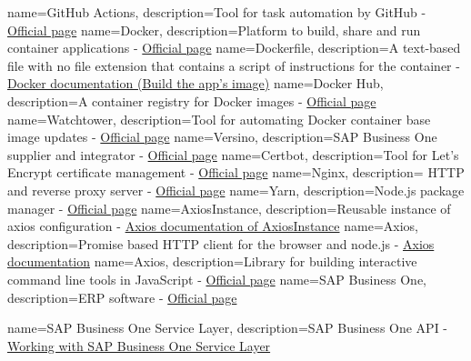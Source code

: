 {
        name=GitHub Actions,
        description={Tool for task automation by GitHub - \href{https://github.com/features/actions}{Official page}}
}
{
        name=Docker,
        description={Platform to build, share and run container applications - \href{https://www.docker.com}{Official page}}
}
{
        name=Dockerfile,
        description={A text-based file with no file extension that contains a script of instructions for the container - \href{https://docs.docker.com/get-started/02_our_app/#build-the-apps-image}{Docker documentation (Build the app's image)}}
}
{
        name=Docker Hub,
        description={A container registry for Docker images - \href{https://hub.docker.com}{Official page}}
}
{
        name=Watchtower,
        description={Tool for automating Docker container base image updates - \href{https://containrrr.dev/watchtower/}{Official page}}
}
{
        name=Versino,
        description={SAP Business One supplier and integrator -  \href{https://www.versino.cz/cs-cz/}{Official page}}
}
{
        name=Certbot,
        description={Tool for Let's Encrypt certificate management -  \href{https://certbot.eff.org}{Official page}}
}
{
        name=Nginx,
        description={ HTTP and reverse proxy server -  \href{https://www.nginx.com}{Official page}}
}
{
        name=Yarn,
        description={Node.js package manager -  \href{https://www.yarnpkg.com}{Official page}}
}
{
        name=AxiosInstance,
        description={Reusable instance of axios configuration -  \href{https://axios-http.com/docs/instance}{Axios documentation of AxiosInstance}}
}
{
        name=Axios,
        description={Promise based HTTP client for the browser and node.js -  \href{https://axios-http.com/}{Axios documentation}}
}
{
        name=Axios,
        description={Library for building interactive command line tools in JavaScript -  \href{https://yargs.js.org/}{Official page}}
}
{
        name=SAP Business One,
        description={ERP software -  \href{https://www.sap.com/products/erp/business-one.html}{Official page}}
}

{
        name=SAP Business One Service Layer,
        description={SAP Business One API -  \href{https://help.sap.com/doc/0d2533ad95ba4ad7a702e83570a21c32/9.3/en-US/Working_with_SAP_Business_One_Service_Layer.pdf}{Working with SAP Business One Service Layer}}
}

